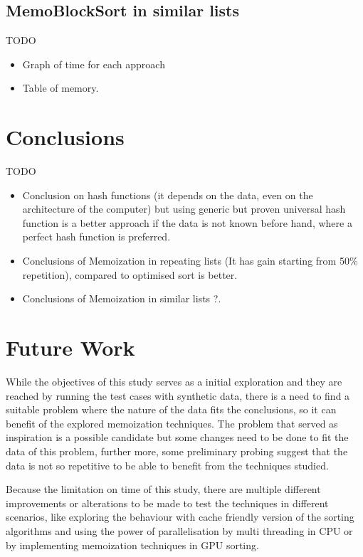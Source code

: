 \documentclass[a4paper,12pt]{article}
\begin{document}
\subsection{MemoBlockSort in similar lists}

TODO
\begin{itemize}
\item Graph of time for each approach
\item Table of memory.
\end{itemize}

\section{Conclusions}

TODO
\begin{itemize}
\item Conclusion on hash functions (it depends on the data, even on the architecture of the computer) but using generic but proven universal hash function is a better approach if the data is not known before hand, where a perfect hash function is preferred.
\item Conclusions of Memoization in repeating lists (It has gain starting from 50\% repetition), compared to optimised sort is better.
\item  Conclusions of Memoization in similar lists ?.
\end{itemize}

\section{Future Work}

While the objectives of this study serves as a initial exploration and they are reached by running the test cases with synthetic data, there is a need to find a suitable problem where the nature of the data fits the conclusions, so it can benefit of  the explored memoization techniques. The problem that served as inspiration \cite{Arch2015} is a possible candidate but some changes need to be done to fit the data of this problem, further more, some preliminary probing suggest that the data is not so repetitive to be able to benefit from the techniques studied.

Because the limitation on time of this study, there are multiple different improvements or alterations to be made to test the techniques in different scenarios, like exploring the behaviour with cache friendly version of the sorting algorithms and using the power of parallelisation by multi threading in CPU or by implementing memoization techniques in GPU sorting.
\end{document}
